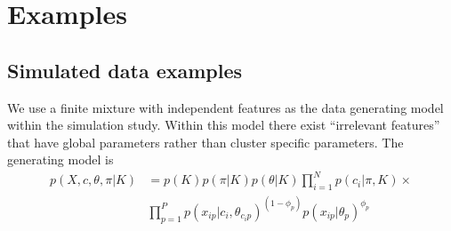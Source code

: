 \documentclass{bioinfo}
\begin{document}


\section{Examples}

\subsection{Simulated data examples}
We use a finite mixture with independent features as the data generating model within the simulation study.
Within this model there exist ``irrelevant features'' \citep{law2003feature} that have global parameters rather than cluster specific parameters. 
The generating model is
\begin{align*}
	p(X, c, \theta, \pi| K) &= p(K) p(\pi| K) p(\theta|K) \prod_{i=1}^N p (c_i | \pi, K)  \times \\
	& \prod_{p=1}^P p(x_{ip} | c_i, \theta_{c_ip})^{(1 - \phi_p)} p(x_{ip} | \theta_p) ^ {\phi_p}
\end{align*}
\end{document}
